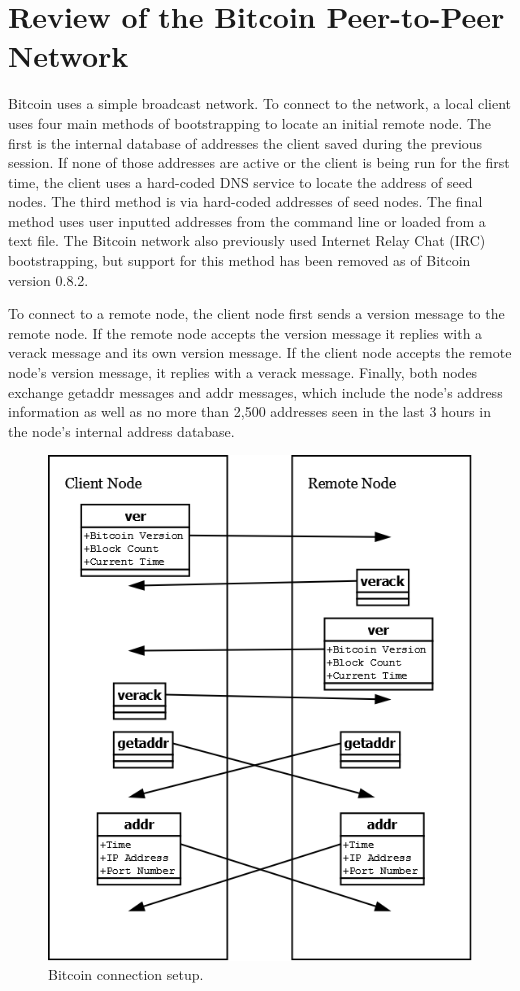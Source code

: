 \section{Review of the Bitcoin Peer-to-Peer Network}
Bitcoin uses a simple broadcast network. To connect to the network, a local client uses four main methods of bootstrapping to locate an initial remote node.  The first is the internal database of addresses the client saved during the previous session.  If none of those addresses are active or the client is being run for the first time, the client uses a hard-coded DNS service to locate the address of seed nodes.   The third method is via hard-coded addresses of seed nodes.  The final method uses user inputted addresses from the command line or loaded from a text file.  The Bitcoin network also previously used Internet Relay Chat (IRC) bootstrapping, but support for this method has been removed as of Bitcoin version 0.8.2.

To connect to a remote node, the client node first sends a version message to the remote node. If the remote node accepts the version message it replies with a verack message and its own version message. If the client node accepts the remote node’s version message, it replies with a verack message.  Finally, both nodes exchange getaddr messages and addr messages, which include the node’s address information as well as no more than 2,500 addresses seen in the last 3 hours in the node’s internal address database.

\begin{figure}[ht!]
\begin{center}
\includegraphics[scale=0.3]{./images/bitcoin_peer_protocol.png}
\caption{Bitcoin connection setup.}
\label{fig:bitcoin_peer_protocol}
\end{center}
\end{figure}

